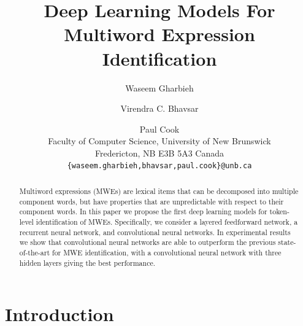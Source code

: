 \documentclass[11pt,a4paper]{article}
\title{Deep Learning Models For Multiword Expression Identification}
\author{Waseem Gharbieh \and Virendra C. Bhavsar \and Paul Cook\\
	Faculty of Computer Science, University of New Brunswick\\
	Fredericton, NB E3B 5A3 Canada\\
	{\tt \{waseem.gharbieh,bhavsar,paul.cook\}@unb.ca}}
\date{}
\begin{document}
\maketitle
\begin{abstract}
Multiword expressions (MWEs) are lexical items that can be decomposed
into multiple component words, but have properties that are
unpredictable with respect to their component words. In this paper we
propose the first deep learning models for token-level identification
of MWEs. Specifically, we consider a layered feedforward network, a
recurrent neural network, and convolutional neural networks. In
experimental results we show that convolutional neural networks are
able to outperform the previous state-of-the-art for MWE
identification, with a convolutional neural network with three hidden
layers giving the best performance.
\end{abstract}

\section{Introduction}

\end{document}
